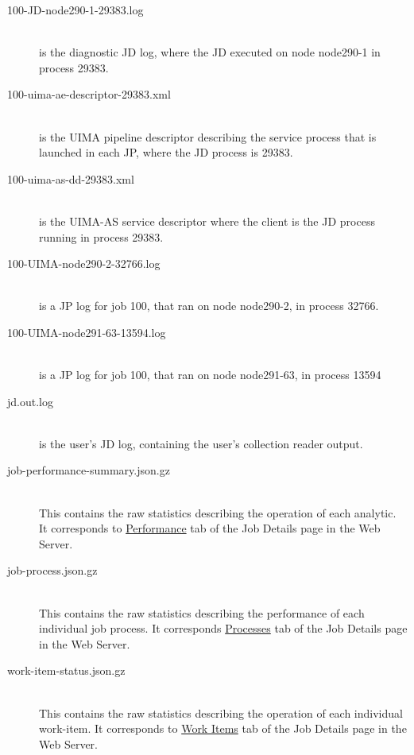 \begin{description}
     \item[100-JD-node290-1-29383.log]  \hfill \\
       is the diagnostic JD log, where the JD executed on node
       node290-1 in process 29383.

     \item[100-uima-ae-descriptor-29383.xml]  \hfill \\
       is the UIMA pipeline descriptor describing the
       service process that is launched in each JP, where the JD process is 29383.

     \item[100-uima-as-dd-29383.xml]  \hfill \\
       is the UIMA-AS service descriptor where the client is
       the JD process running in process 29383.

     \item[100-UIMA-node290-2-32766.log]  \hfill \\
       is a JP log for job 100, that ran on node
       node290-2, in process 32766.

     \item[100-UIMA-node291-63-13594.log]  \hfill \\
       is a JP log for job 100, that ran on node
       node291-63, in process 13594

     \item[jd.out.log]  \hfill \\
       is the user's JD log, containing the user's collection reader output.

     \item[job-performance-summary.json.gz]  \hfill \\
       This contains the raw statistics describing
       the operation of each analytic.  It corresponds to \hyperref[sec:performance]{Performance}
       tab of the Job Details page in the Web Server.

     \item[job-process.json.gz]  \hfill \\
       This contains the raw statistics describing
       the performance of each individual job process.  It corresponds \hyperref[sec:ws-processes]{Processes}
       tab of the Job Details page in the Web Server.

     \item[work-item-status.json.gz]  \hfill \\
       This contains the raw statistics describing
       the operation of each individual work-item.  It corresponds to \hyperref[sec:ws-work-items]{Work Items}
       tab of the Job Details page in the Web Server.
 \end{description}
     
